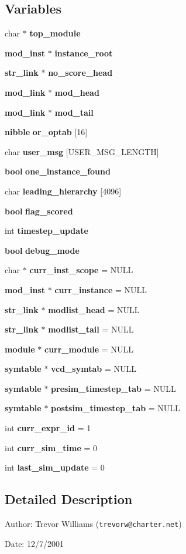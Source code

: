 \subsection*{Variables}
\begin{CompactItemize}
\item 
char $\ast$ {\bf top\_\-module}
\item 
{\bf mod\_\-inst} $\ast$ {\bf instance\_\-root}
\item 
{\bf str\_\-link} $\ast$ {\bf no\_\-score\_\-head}
\item 
{\bf mod\_\-link} $\ast$ {\bf mod\_\-head}
\item 
{\bf mod\_\-link} $\ast$ {\bf mod\_\-tail}
\item 
{\bf nibble} {\bf or\_\-optab} [16]
\item 
char {\bf user\_\-msg} [USER\_\-MSG\_\-LENGTH]
\item 
{\bf bool} {\bf one\_\-instance\_\-found}
\item 
char {\bf leading\_\-hierarchy} [4096]
\item 
{\bf bool} {\bf flag\_\-scored}
\item 
int {\bf timestep\_\-update}
\item 
{\bf bool} {\bf debug\_\-mode}
\item 
char $\ast$ {\bf curr\_\-inst\_\-scope} = NULL
\item 
{\bf mod\_\-inst} $\ast$ {\bf curr\_\-instance} = NULL
\item 
{\bf str\_\-link} $\ast$ {\bf modlist\_\-head} = NULL
\item 
{\bf str\_\-link} $\ast$ {\bf modlist\_\-tail} = NULL
\item 
{\bf module} $\ast$ {\bf curr\_\-module} = NULL
\item 
{\bf symtable} $\ast$ {\bf vcd\_\-symtab} = NULL
\item 
{\bf symtable} $\ast$ {\bf presim\_\-timestep\_\-tab} = NULL
\item 
{\bf symtable} $\ast$ {\bf postsim\_\-timestep\_\-tab} = NULL
\item 
int {\bf curr\_\-expr\_\-id} = 1
\item 
int {\bf curr\_\-sim\_\-time} = 0
\item 
int {\bf last\_\-sim\_\-update} = 0
\end{CompactItemize}


\subsection{Detailed Description}
\begin{Desc}
\item[Author:]Trevor Williams ({\tt trevorw@charter.net}) \end{Desc}
\begin{Desc}
\item[Date:]12/7/2001\end{Desc}


